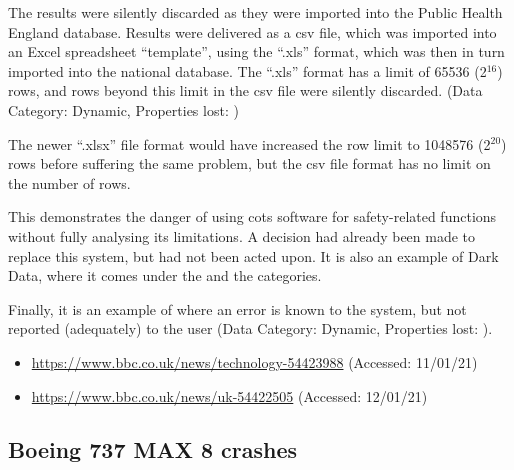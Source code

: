 The results were silently discarded as they were imported into the Public Health England database. Results were delivered as a \gls{csv} file, which was imported into an Excel spreadsheet ``template'', using the ``.xls'' format, which was then in turn imported into the national database. The ``.xls'' format has a limit of 65536 (2$^{16}$) rows, and rows beyond this limit in the \gls{csv} file were silently discarded. (Data Category: Dynamic, Properties lost: )

The newer ``.xlsx'' file format would have increased the row limit to 1048576 (2$^{20}$) rows before suffering the same problem, but the \gls{csv} file format has no limit on the number of rows.

This demonstrates the danger of using \gls{cots} software for safety-related functions without fully analysing its limitations. A decision had already been made to replace this system, but had not been acted upon. It is also an example of Dark Data, where it comes under the
 and the  categories.

Finally, it is an example of where an error is known to the system, but not reported (adequately) to the user (Data Category: Dynamic, Properties lost: ).

\begin{itemize}
  \item\href{https://www.bbc.co.uk/news/technology-54423988}{https://www.bbc.co.uk/news/technology-54423988} (Accessed: 11/01/21)
  \item\href{https://www.bbc.co.uk/news/uk-54422505}{https://www.bbc.co.uk/news/uk-54422505} (Accessed: 12/01/21)
\end{itemize}


\subsection{Boeing 737 MAX 8 crashes} \label{bkm:incacc:737max8}

